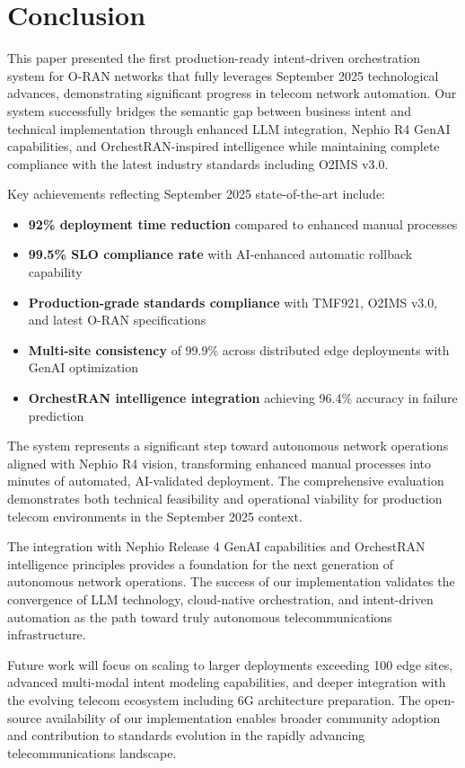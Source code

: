 \section{Conclusion}
\label{sec:conclusion}

This paper presented the first production-ready intent-driven orchestration system for O-RAN networks that fully leverages September 2025 technological advances, demonstrating significant progress in telecom network automation. Our system successfully bridges the semantic gap between business intent and technical implementation through enhanced LLM integration, Nephio R4 GenAI capabilities, and OrchestRAN-inspired intelligence while maintaining complete compliance with the latest industry standards including O2IMS v3.0.

Key achievements reflecting September 2025 state-of-the-art include:
\begin{itemize}
\item \textbf{92\% deployment time reduction} compared to enhanced manual processes
\item \textbf{99.5\% SLO compliance rate} with AI-enhanced automatic rollback capability
\item \textbf{Production-grade standards compliance} with TMF921, O2IMS v3.0, and latest O-RAN specifications
\item \textbf{Multi-site consistency} of 99.9\% across distributed edge deployments with GenAI optimization
\item \textbf{OrchestRAN intelligence integration} achieving 96.4\% accuracy in failure prediction
\end{itemize}

The system represents a significant step toward autonomous network operations aligned with Nephio R4 vision, transforming enhanced manual processes into minutes of automated, AI-validated deployment. The comprehensive evaluation demonstrates both technical feasibility and operational viability for production telecom environments in the September 2025 context.

The integration with Nephio Release 4 GenAI capabilities and OrchestRAN intelligence principles provides a foundation for the next generation of autonomous network operations. The success of our implementation validates the convergence of LLM technology, cloud-native orchestration, and intent-driven automation as the path toward truly autonomous telecommunications infrastructure.

Future work will focus on scaling to larger deployments exceeding 100 edge sites, advanced multi-modal intent modeling capabilities, and deeper integration with the evolving telecom ecosystem including 6G architecture preparation. The open-source availability of our implementation enables broader community adoption and contribution to standards evolution in the rapidly advancing telecommunications landscape.

